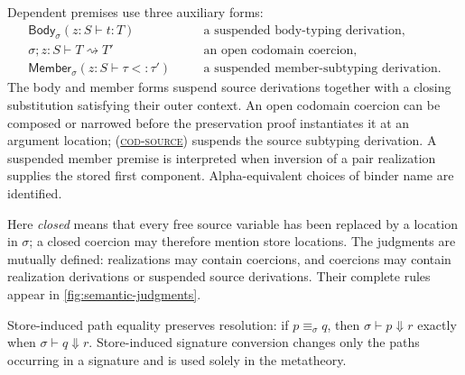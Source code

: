 \documentclass[acmsmall,screen,nonacm]{acmart}
\newcommand{\ruleref}[1]{%
  \textsc{(\hyperref[rule:#1]{#1})}}
\newcommand{\resolve}{\Downarrow}
\newcommand{\coerce}{\mathrel{\rightsquigarrow}}
\newcommand{\bodycl}[5]{%
  \mathsf{Body}_{#1}(#2\!:\!#3\vdash #4:#5)}
\newcommand{\membercl}[5]{%
  \mathsf{Member}_{#1}(#2\!:\!#3\vdash #4<:#5)}
\newcommand{\rulesetup}{%
  \small
  \smallrulenames
  \setlength{\afterruleskip}{2em plus 0.2em minus 0.1em}%
  \setlength{\labelminsep}{0.6em}%
  \renewcommand{\arraystretch}{1.15}%
  \renewcommand{\andalso}{\qquad}%
}
\begin{document}
Dependent premises use three auxiliary forms:
\[
\begin{array}{lll}
\bodycl{\sigma}{z}{S}{t}{T}
  &\quad&\text{a suspended body-typing derivation,}\\
\sigma;z:S\vdash T\coerce T'
  &&\text{an open codomain coercion,}\\
\membercl{\sigma}{z}{S}{\tau}{\tau'}
  &&\text{a suspended member-subtyping derivation.}
\end{array}
\]
The body and member forms suspend source derivations together with a closing
substitution satisfying their outer context. An open codomain coercion can be
composed or narrowed before the preservation proof instantiates it at an
argument location; \ruleref{cod-source} suspends the source subtyping derivation. A
suspended member premise is interpreted when inversion of a pair realization
supplies the stored first component. Alpha-equivalent choices of binder name
are identified.

Here \emph{closed} means that every free source variable has been replaced
by a location in \(\sigma\); a closed coercion may therefore mention store
locations. The judgments are mutually defined: realizations may contain
coercions, and coercions may contain realization derivations or suspended
source derivations. Their complete rules appear in
\cref{fig:semantic-judgments}.

Store-induced path equality preserves resolution: if
\(p\equiv_\sigma q\), then
\(\sigma\vdash p\resolve r\) exactly when
\(\sigma\vdash q\resolve r\). Store-induced signature conversion changes only
the paths occurring in a signature and is used solely in the metatheory.

\clearpage
\begingroup
\setlength{\abovedisplayskip}{5pt plus 1pt minus 1pt}
\setlength{\belowdisplayskip}{5pt plus 1pt minus 1pt}
\setlength{\intextsep}{4pt}
\captionsetup{skip=6pt}
\rulesetup
\end{document}
